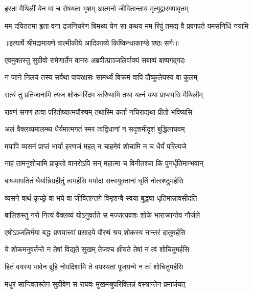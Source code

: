 \twolineshloka
{हरता मैथिलीं येन मां च रोषयता भृशम्}
{आत्मनो जीवितान्ताय मृत्युद्वारमपावृतम्} %

\fourlineindentedshloka
{मम दयिततमा हृता वना}
{द्रजनिचरेण विमथ्य येन सा}
{कथय मम रिपुं तमद्य वै}
{ प्रवगपते यमसंनिधिं नयामि} %


{॥इत्यार्षे श्रीमद्रामायणे वाल्मीकीये आदिकाव्ये किष्किन्धाकाण्डे षष्ठः सर्गः॥}


\twolineshloka
{एवमुक्तस्तु सुग्रीवो रामेणार्तेन वानरः}
{अब्रवीत्प्राञ्जलिर्वाक्यं सबाष्पं बाष्पगद्गदः} %

\twolineshloka
{न जाने निलयं तस्य सर्वथा पापरक्षसः}
{सामर्थ्यं विक्रमं वापि दौष्कुलेयस्य वा कुलम्} %

\twolineshloka
{सत्यं तु प्रतिजानामि त्यज शोकमरिंदम}
{करिष्यामि तथा यत्नं यथा प्राप्स्यसि मैथिलीम्} %

\twolineshloka
{रावणं सगणं हत्वा परितोष्यात्मपौरुषम्}
{तथास्मि कर्ता नचिराद्यथा प्रीतो भविष्यसि} %

\twolineshloka
{अलं वैक्लव्यमालम्ब्य धैर्यमात्मगतं स्मर}
{त्वद्विधानां न सदृशमीदृशं बुद्धिलाघवम्} %

\twolineshloka
{मयापि व्यसनं प्राप्तं भार्या हरणजं महत्}
{न चाहमेवं शोचामि न च धैर्यं परित्यजे} %

\twolineshloka
{नाहं तामनुशोचामि प्राकृतो वानरोऽपि सन्}
{महात्मा च विनीतश्चा किं पुनर्धृतिमान्भवान्} %

\twolineshloka
{बाष्पमापतितं धैर्यान्निग्रहीतुं त्वमर्हसि}
{मर्यादां सत्त्वयुक्तानां धृतिं नोत्स्रष्टुमर्हसि} %

\twolineshloka
{व्यसने वार्थ कृच्छ्रे वा भये वा जीवितान्तगे}
{विमृशन्वै स्वया बुद्ध्या धृतिमान्नावसीदति} %

\twolineshloka
{बालिशस्तु नरो नित्यं वैक्लव्यं योऽनुवर्तते}
{स मज्जत्यवशः शोके भाराक्रान्तेव नौर्जले} %

\twolineshloka
{एषोऽञ्जलिर्मया बद्धः प्रणयात्त्वां प्रसादये}
{पौरुषं श्रय शोकस्य नान्तरं दातुमर्हसि} %

\twolineshloka
{ये शोकमनुवर्तन्ते न तेषां विद्यते सुखम्}
{तेजश्च क्षीयते तेषां न त्वं शोचितुमर्हसि} %

\twolineshloka
{हितं वयस्य भावेन ब्रूहि नोपदिशामि ते}
{वयस्यतां पूजयन्मे न त्वं शोचितुमर्हसि} %

\twolineshloka
{मधुरं सान्त्वितस्तेन सुग्रीवेण स राघवः}
{मुखमश्रुपरिक्लिन्नं वस्त्रान्तेन प्रमार्जयत्} %


